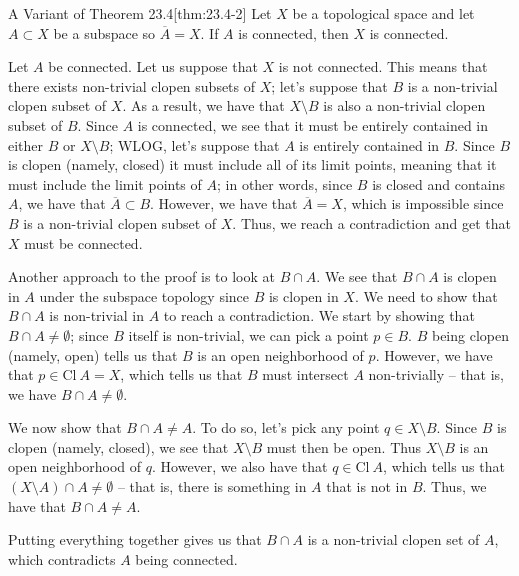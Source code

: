 \begin{thmBox}{A Variant of Theorem 23.4}[thm:23.4-2]
    Let \( X \) be a topological space and let \( A \subset X \) be a subspace
    so \( \overline{ A } = X \).
    If \( A \) is connected, then \( X \) is connected.

    \baseRule

    \begin{proofBox}
        Let \( A \) be connected.
        Let us suppose that \( X \) is not connected.
        This means that there exists non-trivial clopen subsets of \( X \);
        let's suppose that \( B \) is a non-trivial clopen subset of \( X \).
        As a result, we have that \( X \setminus B \) is also a non-trivial 
        clopen subset of \( B \).
        Since \( A \) is connected, we see that it must be entirely contained
        in either \( B \) or \( X \setminus B \); WLOG, let's suppose that 
        \( A \) is entirely contained in \( B \).
        Since \( B \) is clopen (namely, closed) it must include all of its
        limit points, meaning that it must include the limit points of \( A \);
        in other words, since \( B \) is closed and contains \( A \), we have 
        that \( \overline{ A } \subset B \).
        However, we have that \( \overline{ A } = X \), which is impossible 
        since \( B \) is a non-trivial clopen subset of \( X \).
        Thus, we reach a contradiction and get that \( X \) must be connected.

        \baseRule

        Another approach to the proof is to look at \( B \cap A \).
        We see that \( B \cap A \) is clopen in \( A \) under the subspace 
        topology since \( B \) is clopen in \( X \).
        We need to show that \( B \cap A \) is non-trivial in \( A \) to 
        reach a contradiction.
        We start by showing that \( B \cap A \neq \emptyset \); since \( B \) 
        itself is non-trivial, we can pick a point \( p \in B \).
        \( B \) being clopen (namely, open) tells us that \( B \) is 
        an open neighborhood of \( p \).
        However, we have that \( p \in \mathrm{Cl} \ A = X \), which tells us 
        that \( B \) must intersect \( A \) non-trivially -- that is, we have
        \( B \cap A \neq \emptyset \).

        \baseSkip

        We now show that \( B \cap A \neq A \).
        To do so, let's pick any point \( q \in X \setminus B \).
        Since \( B \) is clopen (namely, closed), we see that 
        \( X \setminus B \) must then be open.
        Thus \( X \setminus B \) is an open neighborhood of \( q \).
        However, we also have that \( q \in \mathrm{Cl} \ A \), which tells
        us that \( ( X \setminus A ) \cap A \neq \emptyset \) -- that is, there
        is something in \( A \) that is not in \( B \).
        Thus, we have that \( B \cap A \neq A \).

        \baseSkip 

        Putting everything together gives us that \( B \cap A \) is a
        non-trivial clopen set of \( A \), which contradicts \( A \) being 
        connected.
    \end{proofBox}
\end{thmBox}